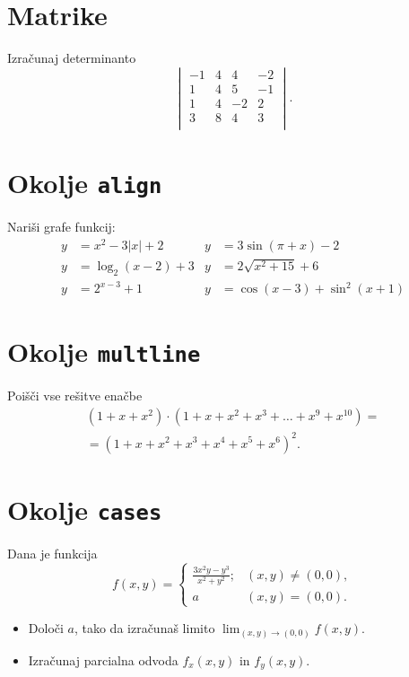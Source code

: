 \documentclass[a4paper,12pt]{article}
\begin{document}
\section*{Matrike}
Izračunaj determinanto
\[\begin{vmatrix}
       -1 & 4 & 4 & -2 \\
       1 & 4 & 5 & -1 \\
       1 & 4 & -2 & 2 \\
       3 & 8 & 4 & 3 \\
\end{vmatrix}.\]

\section*{Okolje \texttt{align}}
Nariši grafe funkcij:
\begin{align*}
   y &= x^2 - 3|x| + 2    & y &= 3 \sin(\pi+x) - 2 \\
   y &= \log_2(x-2) + 3   & y &= 2 \sqrt{x^2+15} + 6 \\
   y &= 2^{x-3} + 1       & y &= \cos(x-3) + \sin^2(x+1)
\end{align*}

\section*{Okolje \texttt{multline}}
Poišči vse rešitve enačbe
\begin{multline*}
   (1+x+x^2) \cdot (1+x+x^2+x^3+\ldots+x^9+x^{10}) = \\
   =(1+x+x^2+x^3+x^4+x^5+x^6)^2.
\end{multline*}

\section*{Okolje \texttt{cases}}
Dana je funkcija
  \[f(x,y)=
  \begin{cases}
      \frac{3x^2y-y^3}{x^2+y^2}; &(x,y)\neq(0,0),\\
      a &(x,y)=(0,0).
    \end{cases}\]
\begin{itemize}
\item Določi \(a\), tako da izračunaš limito \( \lim_{(x,y)\to(0,0)} f(x,y) \).
\item Izračunaj parcialna odvoda \(f_x(x,y)\) in \(f_y(x,y)\).
\end{itemize}
\end{document}
